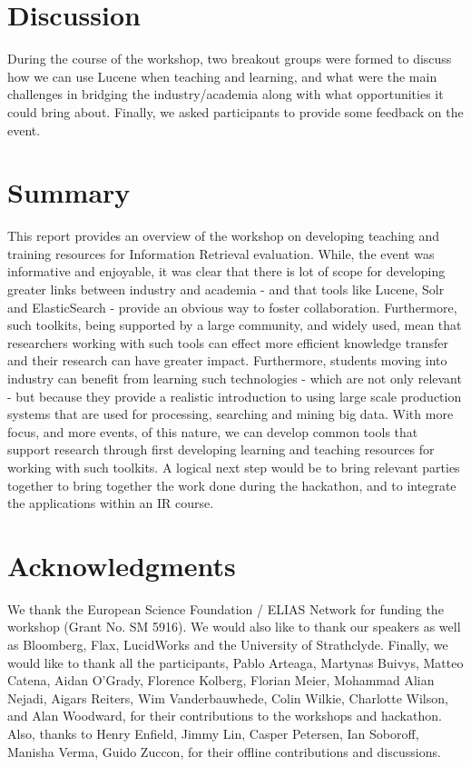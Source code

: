 \documentclass[12pt]{article}
\begin{document}
\begin{sloppypar}




\section{Discussion}
During the course of the workshop, two breakout groups were formed to discuss how we can use Lucene when teaching and learning, and what were the main challenges in bridging the industry/academia along with what opportunities it could bring about. Finally, we asked participants to provide some feedback on the event.










\section{Summary}
This report provides an overview of the workshop on developing teaching and training resources for Information Retrieval evaluation. While, the event was informative and enjoyable, it was clear that there is lot of scope for developing greater links between industry and academia - and that tools like Lucene, Solr and ElasticSearch - provide an obvious way to foster collaboration. Furthermore, such toolkits, being supported by a large community, and widely used, mean that researchers working with such tools can effect more efficient knowledge transfer and their research can have greater impact. Furthermore, students moving into industry can benefit from learning such technologies - which are not only relevant - but because they provide a realistic introduction to using large scale production systems that are used for processing, searching and mining big data. With more focus, and more events, of this nature, we can develop common tools that support research through first developing learning and teaching resources for working with such toolkits. A logical next step would be to bring relevant parties together to bring together the work done during the hackathon, and to integrate the applications within an IR course.

\section{Acknowledgments}
We thank the European Science Foundation / ELIAS Network for funding the workshop (Grant No. SM 5916). We would also like to thank our speakers as well as Bloomberg, Flax, LucidWorks and the University of Strathclyde. 
Finally, we would like to thank all the participants, 
Pablo Arteaga,
Martynas Buivys, 
Matteo Catena, 
Aidan O'Grady, 
Florence Kolberg, 
Florian Meier,  
Mohammad Alian Nejadi,
Aigars Reiters, 
Wim Vanderbauwhede, 
Colin Wilkie,   
Charlotte Wilson, and 
Alan Woodward, 
for their contributions to the workshops and hackathon. Also, thanks to Henry Enfield, Jimmy Lin, Casper Petersen, Ian Soboroff, Manisha Verma, Guido Zuccon, for their offline contributions and discussions.



{}


%
\end{sloppypar}
\end{document}
